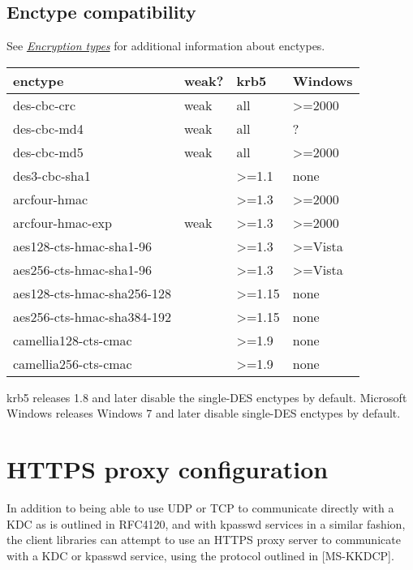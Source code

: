 \documentclass[letterpaper,10pt,english]{sphinxmanual}
\begin{document}
\section{Enctype compatibility}
\label{admin/enctypes:enctype-compatibility}
See {\hyperref[admin/conf_files/kdc_conf:encryption-types]{\emph{Encryption types}}} for additional information about enctypes.

\begin{tabulary}{\linewidth}{|L|L|L|L|}
\hline
\textsf{\relax 
enctype
} & \textsf{\relax 
weak?
} & \textsf{\relax 
krb5
} & \textsf{\relax 
Windows
}\\
\hline
des-cbc-crc
 & 
weak
 & 
all
 & 
\textgreater{}=2000
\\
\hline
des-cbc-md4
 & 
weak
 & 
all
 & 
?
\\
\hline
des-cbc-md5
 & 
weak
 & 
all
 & 
\textgreater{}=2000
\\
\hline
des3-cbc-sha1
 &  & 
\textgreater{}=1.1
 & 
none
\\
\hline
arcfour-hmac
 &  & 
\textgreater{}=1.3
 & 
\textgreater{}=2000
\\
\hline
arcfour-hmac-exp
 & 
weak
 & 
\textgreater{}=1.3
 & 
\textgreater{}=2000
\\
\hline
aes128-cts-hmac-sha1-96
 &  & 
\textgreater{}=1.3
 & 
\textgreater{}=Vista
\\
\hline
aes256-cts-hmac-sha1-96
 &  & 
\textgreater{}=1.3
 & 
\textgreater{}=Vista
\\
\hline
aes128-cts-hmac-sha256-128
 &  & 
\textgreater{}=1.15
 & 
none
\\
\hline
aes256-cts-hmac-sha384-192
 &  & 
\textgreater{}=1.15
 & 
none
\\
\hline
camellia128-cts-cmac
 &  & 
\textgreater{}=1.9
 & 
none
\\
\hline
camellia256-cts-cmac
 &  & 
\textgreater{}=1.9
 & 
none
\\
\hline\end{tabulary}


krb5 releases 1.8 and later disable the single-DES enctypes by
default.  Microsoft Windows releases Windows 7 and later disable
single-DES enctypes by default.


\chapter{HTTPS proxy configuration}
\label{admin/https:https-proxy-configuration}\label{admin/https::doc}\label{admin/https:https}
In addition to being able to use UDP or TCP to communicate directly
with a KDC as is outlined in RFC4120, and with kpasswd services in a
similar fashion, the client libraries can attempt to use an HTTPS
proxy server to communicate with a KDC or kpasswd service, using the
protocol outlined in {[}MS-KKDCP{]}.
\end{document}
